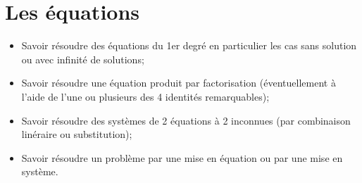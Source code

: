 \chapter{Les équations}



\begin{acquis}
\begin{itemize}
\item Savoir résoudre des équations du 1er degré en particulier les cas sans solution ou avec infinité de solutions;
\item Savoir résoudre une équation produit par factorisation (éventuellement à l’aide de l’une ou plusieurs des 4 identités remarquables);
\item Savoir résoudre des systèmes de 2 équations à 2 inconnues (par combinaison linéraire ou substitution);
\item Savoir résoudre un problème par une mise en équation ou par une mise en système.
\end{itemize}
\end{acquis}

\exercicesbase
\begin{colonne*exercice}

\end{colonne*exercice}




\connaissances




\pagebreak


%


